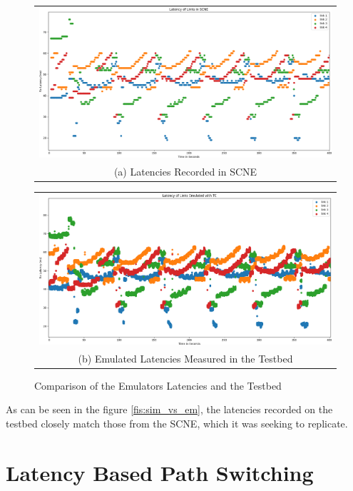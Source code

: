\begin{figure}
  \centering
  \begin{tabular}{@{}c@{}}
    \includegraphics[width=\linewidth]{fig/simulated_latencies.png} \\[\abovecaptionskip]
    \small (a) Latencies Recorded in SCNE
  \end{tabular}

  \vspace{\floatsep}

  \begin{tabular}{@{}c@{}}
    \includegraphics[width=\linewidth]{fig/emulated_latencies.png} \\[\abovecaptionskip]
    \small (b) Emulated Latencies Measured in the Testbed
  \end{tabular}

  \caption{Comparison of the Emulators Latencies and the Testbed}\label{fig:sim_vs_em}
\end{figure}

As can be seen in the figure \ref{fis:sim_vs_em}, the latencies recorded on the testbed closely match those from the SCNE, which it was seeking to replicate.

\section{Latency Based Path Switching}

